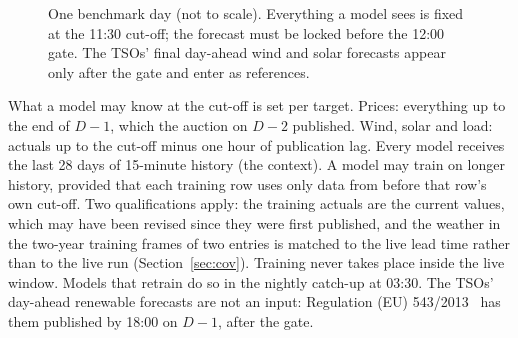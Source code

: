 \documentclass[11pt,a4paper]{article}
\newcommand{\m}[1]{\texttt{#1}}
\begin{document}
\begin{figure}[t]
\centering
{}
\caption{One benchmark day (not to scale). Everything a model sees is fixed at the 11:30 cut-off; the forecast must
be locked before the 12:00 gate. The TSOs' final day-ahead wind and solar forecasts appear only after the gate and
enter as references.}
\label{fig:timeline}
\end{figure}

What a model may know at the cut-off is set per target. Prices: everything up to the end of $D-1$, which the auction
on $D-2$ published. Wind, solar and load: actuals up to the cut-off minus one hour of publication lag. Every model
receives the last 28 days of 15-minute history (the context). A model may train on longer history, provided that each
training row uses only data from before that row's own cut-off. Two qualifications apply: the training actuals are the
current values, which may have been revised since they were first published, and the weather in the two-year training
frames of two entries is matched to the live lead time rather than to the live run (Section~\ref{sec:cov}). Training
never takes place inside the live window. Models that retrain do so in the nightly catch-up at 03:30. The TSOs' day-ahead renewable forecasts are not
an input: Regulation (EU) 543/2013~\cite{reg543} has them published by 18:00 on $D-1$, after the gate.
\end{document}
